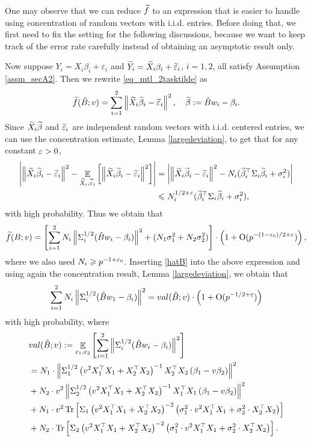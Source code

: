 One may observe that we can reduce $\widetilde f$ to an expression that is easier to handle using concentration of random vectors with i.i.d. entries. Before doing that, we first need to fix the setting for the following discussions, because we want to keep track of the error rate carefully instead of obtaining an asymptotic result only.


Now suppose $Y_i = X_i\beta_i + \varepsilon_i$ and $\widetilde Y_i = \widetilde X_i\beta_i + \widetilde\varepsilon_i$, $i=1,2$, all satisfy Assumption \ref{assm_secA2}. Then we rewrite \eqref{eq_mtl_2tasktilde} as
$$	\widetilde f(\hat B; v) = \sum_{i=1}^2\left\| \widetilde X_i\widetilde\beta_i  - \widetilde {{\varepsilon}}_i\right\|^2 , \quad \widetilde\beta:=\hat B w_i-\beta_i.$$
Since $ \widetilde X_i\widetilde\beta$ and $ \widetilde {{\varepsilon}}_i$ are independent random vectors with i.i.d. centered entries, we can use the concentration estimate, Lemma \ref{largedeviation}, to get that for any constant ${\varepsilon}>0$,
\begin{align*}
\left|\left\| \widetilde X_i\widetilde\beta_i  - \widetilde {{\varepsilon}}_i\right\|^2 -  \mathop{\mathbb{E}}_{\widetilde X_i,\widetilde{{\varepsilon}}_i}\left[ \left\| \widetilde X_i\widetilde\beta_i  - \widetilde {{\varepsilon}}_i\right\|^2 \right] \right| & =\left|\left\| \widetilde X_i\widetilde\beta_i  - \widetilde {{\varepsilon}}_i\right\|^2 - N_i (\widetilde\beta_i^\top \Sigma_i \widetilde\beta_i + \sigma_i^2) \right| \\
&\leqslant N_i^{1/2+{\varepsilon}} (\widetilde\beta_i^\top \Sigma_i \widetilde\beta_i + \sigma_i^2),
\end{align*}
with high probability. Thus we obtain that 
$$\widetilde f(B; v)= \left[\sum_{i=1}^2 N_i\left\|\Sigma_i^{1/2}( \hat B w_i - \beta_i) \right\|^2 + (N_1\sigma^2_1+N_2\sigma^2_2)\right]\cdot \left( 1+\operatorname{O}(p^{-(1-{\varepsilon}_0)/2+{\varepsilon}})\right),$$
where we also used $N_i\geqslant p^{-1+{\varepsilon}_0}$. Inserting \eqref{hatB} into the above expression and using 
 again the concentration result, Lemma \ref{largedeviation}, we obtain that
$$ \sum_{i=1}^2 N_i\left\|\Sigma_i^{1/2}( \hat B w_1 - \beta_i) \right\|^2 = val(\hat B; v)\cdot \left( 1+\operatorname{O}(p^{-1/2+{\varepsilon}})\right)$$
with high probability, where
\begin{align*}
		&val(\hat{B}; v):= \mathop{\mathbb{E}}_{\varepsilon_1,{\varepsilon}_2}\left[ \sum_{i=1}^2 \left\|\Sigma_i^{1/2}( \hat B w_i - \beta_i) \right\|^2 \right] \\
	&=  N_1 \cdot \left\| \Sigma_1^{1/2}\left(v^2 X_1^{\top}X_1 + X_2^{\top}X_2\right)^{-1}X_2^{\top}X_2\left (\beta_1 - v\beta_2\right) \right\|^2 \nonumber \\
	&+ N_2 \cdot v^2\left\| \Sigma_2^{1/2}\left(v^2 X_1^{\top}X_1 + X_2^{\top}X_2\right)^{-1}X_1^{\top}X_1\left(\beta_1 - v\beta_2\right) \right\|^2 \nonumber \\
		&+ N_1   \cdot v^2 \operatorname{Tr}\left[\Sigma_1\left(v^2 X_1^{\top}X_1 + X_2^{\top}X_2\right)^{-2} \left(\sigma_1^2 \cdot v^2X_1^{\top}X_1 + \sigma_2^2 \cdot X_2^{\top}X_2\right)\right] \nonumber \\		
		&+ N_2  \cdot \operatorname{Tr}\left[\Sigma_2\left(v^2 X_1^{\top}X_1 + X_2^{\top}X_2\right)^{-2} \left(\sigma_1^2 \cdot v^2  X_1^{\top}X_1 + \sigma_2^2  \cdot X_2^{\top}X_2\right)\right]. \label{eq_val_mtl}
\end{align*}
